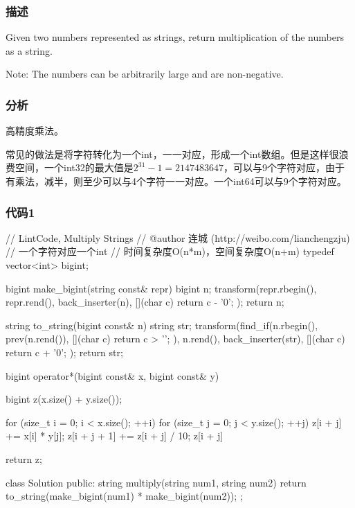 \subsubsection{描述}
Given two numbers represented as strings, return multiplication of the numbers as a string.

Note: The numbers can be arbitrarily large and are non-negative.


\subsubsection{分析}
高精度乘法。

常见的做法是将字符转化为一个int，一一对应，形成一个int数组。但是这样很浪费空间，一个int32的最大值是$2^{31}-1=2147483647$，可以与9个字符对应，由于有乘法，减半，则至少可以与4个字符一一对应。一个int64可以与9个字符对应。


\subsubsection{代码1}
\begin{Code}
// LintCode, Multiply Strings
// @author 连城 (http://weibo.com/lianchengzju)
// 一个字符对应一个int
// 时间复杂度O(n*m)，空间复杂度O(n+m)
typedef vector<int> bigint;

bigint make_bigint(string const& repr) {
    bigint n;
    transform(repr.rbegin(), repr.rend(), back_inserter(n),
            [](char c) { return c - '0'; });
    return n;
}

string to_string(bigint const& n) {
    string str;
    transform(find_if(n.rbegin(), prev(n.rend()),
            [](char c) { return c > '\0'; }), n.rend(), back_inserter(str),
            [](char c) { return c + '0'; });
    return str;
}

bigint operator*(bigint const& x, bigint const& y) {
    bigint z(x.size() + y.size());

    for (size_t i = 0; i < x.size(); ++i)
        for (size_t j = 0; j < y.size(); ++j) {
            z[i + j] += x[i] * y[j];
            z[i + j + 1] += z[i + j] / 10;
            z[i + j] %
        }

    return z;
}

class Solution {
public:
    string multiply(string num1, string num2) {
        return to_string(make_bigint(num1) * make_bigint(num2));
    }
};
\end{Code}


